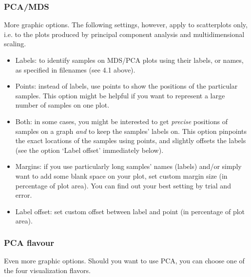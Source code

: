 \documentclass[11pt,a4paper]{article}
\def\margin#1{\marginpar{\textcolor{blue}{\footnotesize\tt #1}}}
\begin{document}
\subsubsection{PCA/MDS}

More graphic options. The following settings, however, apply to scatterplots
only, i.e. to the plots produced by principal component analysis and
multidimensional scaling.

\begin{itemize}
\item Labels:\margin{text.id.on.graphs=}\margin{"labels"}
to identify samples on MDS/PCA plots using their labels, or names,
as specified in filenames (see 4.1 above). 

\item Points:\margin{"points"} instead of
labels, use points to show the positions of the particular samples.
This option might be helpful if you want to represent a large number
of samples on one plot. 

\item Both:\margin{"both"} in some cases,
you might be interested to get \emph{precise} positions of samples
on a graph \emph{and} to keep the samples' labels on. This option
pinpoints the exact locations of the samples using points, and slightly
offsets the labels (see the option `Label offset' immediately below). 

\item Margins:\margin{add.to.margins=}\margin{<integer>} if you use
particularly long samples' names (labels) and/or simply want to add
some blank space on your plot, set custom margin size (in percentage
of plot area). You can find out your best setting by trial and error.

\item Label offset:\margin{label.offset=}\margin{<integer>} set custom
offset between label and point (in percentage of plot area). 
\end{itemize}



\subsubsection{PCA flavour}

Even more graphic options.\margin{pca.visual.flavour=} Should you
want to use PCA, you can choose one of the four visualization flavors.
\end{document}
